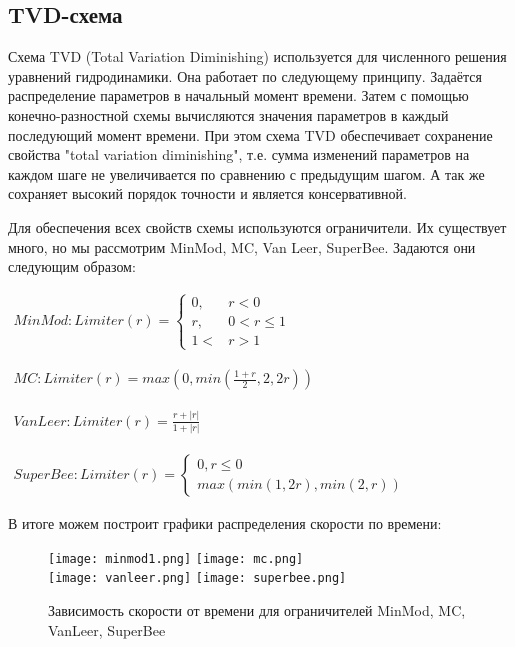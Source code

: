 \subsection*{TVD-схема}
Схема TVD (Total Variation Diminishing) используется для численного решения уравнений гидродинамики. Она работает по следующему принципу. 
Задаётся распределение параметров в начальный момент времени. 
Затем с помощью конечно-разностной схемы вычисляются значения параметров в каждый последующий момент времени. 
При этом схема TVD обеспечивает сохранение свойства "total variation diminishing", т.е. сумма изменений параметров 
на каждом шаге не увеличивается по сравнению с предыдущим шагом. А так же сохраняет высокий порядок точности и является консервативной.

Для обеспечения всех свойств схемы используются ограничители. Их существует много, но мы рассмотрим MinMod, MC, Van Leer, SuperBee.
Задаются они следующим образом:

$
\begin{aligned}
	MinMod: Limiter(r)=\begin{cases}
        0, &r<0\\
        r, &0<r\leq 1\\
        1< &r>1
    \end{cases}
\end{aligned}
$

$
\begin{aligned}
    MC: Limiter(r)=max \left(0, min \left(\frac{1+r}{2},2,2r \right)\right)
\end{aligned}
$ 

$
\begin{aligned}
    VanLeer: Limiter(r)=\frac{r+|r|}{1+|r|}
\end{aligned}
$

$
\begin{aligned}
    SuperBee: Limiter(r)=\begin{cases}
        0, r\leq 0\\
        max(min(1,2r),min(2,r))
    \end{cases}
\end{aligned}
$

В итоге можем построит графики распределения скорости по времени:

\begin{figure}[h]
    \centering
    \texttt{[image: minmod1.png]}
    \texttt{[image: mc.png]}\\
    \texttt{[image: vanleer.png]}
    \texttt{[image: superbee.png]}    
    \caption{Зависимость скорости от времени для ограничителей MinMod, MC, VanLeer, SuperBee}
    \label{sc}
    \end{figure}